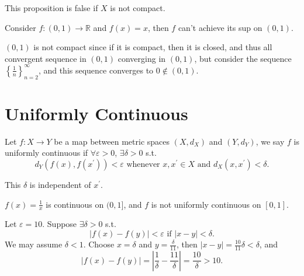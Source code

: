 
\begin{eg}
    This proposition is false if \(X\) is not compact.  
\end{eg}
\begin{explanation}
    Consider \(f:(0, 1) \to \mathbb{R} \) and \(f(x) =x\), then \(f\) can't achieve its sup on \((0, 1)\).
    \begin{note}
        \((0, 1)\) is not compact since if it is compact, then it is closed, and thus all convergent sequence in \((0, 1)\) converging in \((0, 1)\), but consider the sequence \(\left\{ \frac{1}{n} \right\}_{n=2}^{\infty}  \), and this sequence converges to \(0 \notin (0, 1)\).     
    \end{note}    
\end{explanation}
\section{Uniformly Continuous}
\begin{definition} \label{def: uniformly conti}
    Let \(f:X \to Y\) be a map between metric spaces \((X, d_X)\) and \((Y, d_Y)\), we say \(f\) is uniformly continuous if \(\forall\varepsilon > 0\), \(\exists \delta > 0\) s.t. 
    \[
        d_Y (f(x), f \left( x^{\prime}  \right) ) < \varepsilon \text{ whenever } x, x^{\prime} \in X \text{ and } d_X \left( x, x^{\prime}  \right) < \delta. 
    \]      
\end{definition}

\begin{remark}
    This \(\delta \) is independent of \(x^{\prime} \). 
\end{remark}

\begin{eg}
    \(f(x)= \frac{1}{x}\) is continuous on \((0, 1]\), and \(f\) is not uniformly continuous on \([0, 1]\).    
\end{eg}
\begin{explanation}
    Let \(\varepsilon = 10\). Suppose \(\exists \delta > 0\) s.t. 
    \[
        \left\vert f(x) - f(y) \right\vert < \varepsilon \text{ if } \vert x - y \vert < \delta. 
    \]  
    We may assume \(\delta < 1\). Choose \(x = \delta \) and \(y = \frac{\delta}{11}\), then \(\vert x - y \vert = \frac{10}{11} \delta < \delta  \), and 
    \[
        \vert f(x) - f(y)  \vert = \left\vert \frac{1}{\delta } - \frac{11}{\delta } \right\vert  = \frac{10}{\delta } > 10.
    \]    
\end{explanation}


